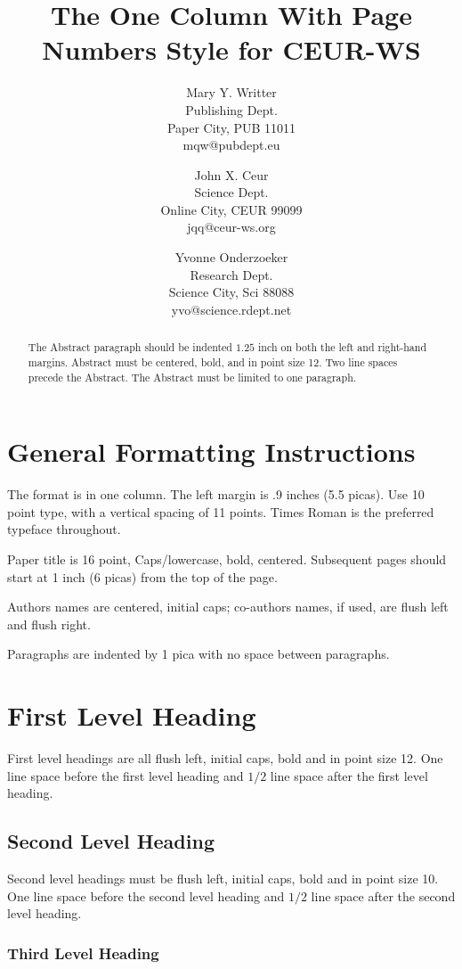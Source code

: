 \documentclass[a4paper]{article}
\title{The One Column With Page Numbers Style for CEUR-WS}
\author{
Mary Y. Writter \\ Publishing Dept.\\
                Paper City, PUB 11011 \\ mqw@pubdept.eu
\and
John X. Ceur \\ Science Dept.\\
                Online City, CEUR 99099 \\ jqq@ceur-ws.org
\and
Yvonne Onderzoeker \\ Research Dept.\\
                Science City, Sci 88088 \\ yvo@science.rdept.net
}
\begin{document}
\maketitle

\begin{abstract}
The Abstract paragraph should be indented $1.25$ inch on both
the left and right-hand margins. Abstract must be centered, bold, and
in point size 12. Two line spaces precede the Abstract. The Abstract
must be limited to one paragraph.
\end{abstract}
\vskip 32pt


\section{General Formatting Instructions}

The format is in one column. The left margin is .9 inches (5.5 picas). Use 10 point type,
with a vertical spacing of 11 points. Times Roman is the preferred
typeface throughout.

Paper title is 16 point, Caps/lowercase, bold, centered. Subsequent
pages should start at 1 inch (6 picas) from the top of the page.

Authors names are centered, initial caps; co-authors names, if used, are
flush left and flush right.

Paragraphs are indented by 1 pica with no space between paragraphs.

\section{First Level Heading}

First level headings are all flush left, initial caps, bold and in point
size 12. One line space before the first level heading and $1/2$ line
space after the first level heading.

\subsection{Second Level Heading}

Second level headings must be flush left, initial caps, bold and in point
size 10. One line space before the second level heading and $1/2$ line
space after the second level heading.

\subsubsection{Third Level Heading}
\end{document}
